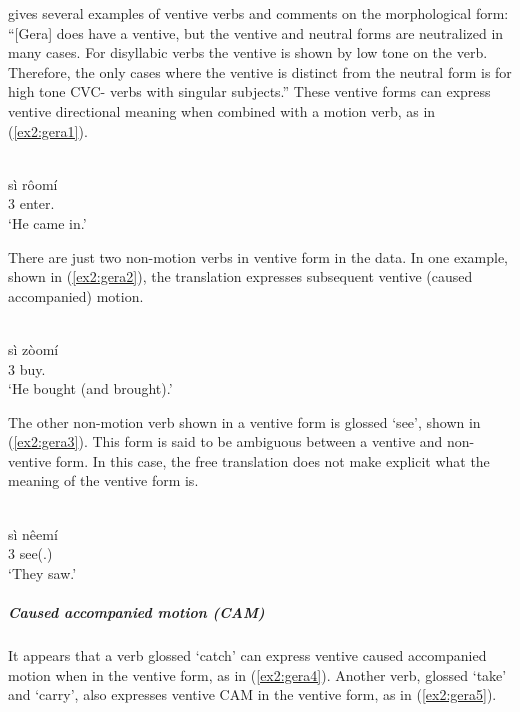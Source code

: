 \citet[99--100]{schuhBoleTangaleLanguagesBauchi1978} gives several examples of ventive verbs and comments on the morphological form: ``[Gera] does have a ventive, but the ventive and neutral forms are neutralized in many cases. For disyllabic verbs the ventive is shown by low tone on the verb. Therefore, the only cases where the ventive is distinct from the neutral form is for high tone CVC- verbs with singular subjects.''  These ventive forms can express ventive directional meaning when combined with a motion verb, as in (\ref{ex2:gera1}). 

\ea\label{ex2:gera1}
 \\
\gll sì rôomí \\
3 enter.	\\
\glt `He came in.'
\z 

There are just two non-motion verbs in ventive form in the data. In one example, shown in (\ref{ex2:gera2}), the translation expresses subsequent ventive (caused accompanied) motion. 

\ea\label{ex2:gera2}
 \\
\gll sì	zòomí \\
3	buy.	 \\
\glt `He bought (and brought).'
\z 

The other non-motion verb shown in a ventive form is glossed ‘see’, shown in (\ref{ex2:gera3}). This form is said to be ambiguous between a ventive and non-ventive form. In this case, the free translation does not make explicit what the meaning of the ventive form is.

\ea\label{ex2:gera3}
 \\
\gll sì	nêemí \\
3	see(.) \\
\glt `They saw.'
\z 

\subparagraph{Caused accompanied motion (CAM)}



It appears that a verb glossed `catch' can express ventive caused accompanied motion when in the ventive form, as in (\ref{ex2:gera4}). Another verb, glossed `take' and `carry', also expresses ventive CAM in the ventive form, as in (\ref{ex2:gera5}).

